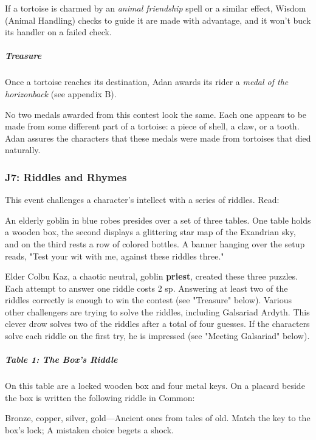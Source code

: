 \documentclass[10pt,a4paper,twoside,bg=print,twocolumn,openany,nodeprecatedcode]{dndbook}
\begin{document}
If a tortoise is charmed by an \textit{animal friendship} spell or a similar effect, Wisdom (Animal Handling) checks to guide it are made with advantage, and it won't buck its handler on a failed check.

\subparagraph{Treasure}
Once a tortoise reaches its destination, Adan awards its rider a \textit{medal of the horizonback} (see appendix B).

No two medals awarded from this contest look the same. Each one appears to be made from some different part of a tortoise: a piece of shell, a claw, or a tooth. Adan assures the characters that these medals were made from tortoises that died naturally.

\subsubsection{J7: Riddles and Rhymes}
This event challenges a character's intellect with a series of riddles. Read:

\begin{DndReadAloud}{}
An elderly goblin in blue robes presides over a set of three tables. One table holds a wooden box, the second displays a glittering star map of the Exandrian sky, and on the third rests a row of colored bottles. A banner hanging over the setup reads, "Test your wit with me, against these riddles three."

\end{DndReadAloud}

Elder Colbu Kaz, a chaotic neutral, goblin \textbf{priest}, created these three puzzles. Each attempt to answer one riddle costs 2 sp. Answering at least two of the riddles correctly is enough to win the contest (see "Treasure" below). Various other challengers are trying to solve the riddles, including Galsariad Ardyth. This clever drow solves two of the riddles after a total of four guesses. If the characters solve each riddle on the first try, he is impressed (see "Meeting Galsariad" below).

\subparagraph{Table 1: The Box's Riddle}
On this table are a locked wooden box and four metal keys. On a placard beside the box is written the following riddle in Common:

\begin{DndReadAloud}{}
Bronze, copper, silver, gold—Ancient ones from tales of old. Match the key to the box's lock; A mistaken choice begets a shock.

\end{DndReadAloud}
\end{document}
